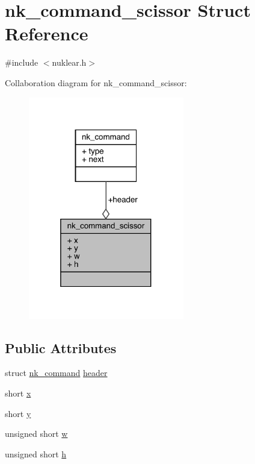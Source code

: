 \hypertarget{structnk__command__scissor}{}\section{nk\+\_\+command\+\_\+scissor Struct Reference}
\label{structnk__command__scissor}


{\ttfamily \#include $<$nuklear.\+h$>$}



Collaboration diagram for nk\+\_\+command\+\_\+scissor\+:
\nopagebreak
\begin{figure}[H]
\begin{center}
\leavevmode
\includegraphics[width=193pt]{structnk__command__scissor__coll__graph}
\end{center}
\end{figure}
\subsection*{Public Attributes}
\begin{DoxyCompactItemize}
\item 
struct \mbox{\hyperlink{structnk__command}{nk\+\_\+command}} \mbox{\hyperlink{structnk__command__scissor_aeddedae36988a3f957d8a56802152b8a}{header}}
\item 
short \mbox{\hyperlink{structnk__command__scissor_aefabf712b38b86e869d552a11c59c9d4}{x}}
\item 
short \mbox{\hyperlink{structnk__command__scissor_a12150dd6ece25013658ea6adcfe5c530}{y}}
\item 
unsigned short \mbox{\hyperlink{structnk__command__scissor_a7659c8208820f4636b65c10f78c662cc}{w}}
\item 
unsigned short \mbox{\hyperlink{structnk__command__scissor_a6d6412b7991f81796c8c30283cc15a37}{h}}
\end{DoxyCompactItemize}


